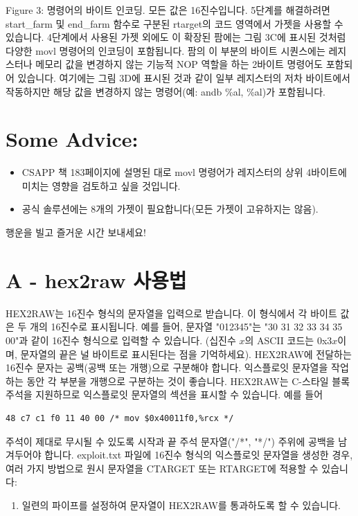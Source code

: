 \documentclass[10pt]{article}
\begin{document}
Figure 3: 명령어의 바이트 인코딩. 모든 값은 16진수입니다. 
\noindent
5단계를 해결하려면 start\_farm 및 end\_farm 함수로 구분된 rtarget의 코드 영역에서 가젯을 사용할 수 있습니다. 4단계에서 사용된 가젯 외에도 이 확장된 팜에는 그림 3C에 표시된 것처럼 다양한 movl 명령어의 인코딩이 포함됩니다. 팜의 이 부분의 바이트 시퀀스에는 레지스터나 메모리 값을 변경하지 않는 기능적 NOP 역할을 하는 2바이트 명령어도 포함되어 있습니다. 여기에는 그림 3D에 표시된 것과 같이 일부 레지스터의 저차 바이트에서 작동하지만 해당 값을 변경하지 않는 명령어(예: andb \%al, \%al)가 포함됩니다.

\section*{Some Advice:}
\begin{itemize}
  \item CSAPP 책 183페이지에 설명된 대로 movl 명령어가 레지스터의 상위 4바이트에 미치는 영향을 검토하고 싶을 것입니다.
  \item 공식 솔루션에는 8개의 가젯이 필요합니다(모든 가젯이 고유하지는 않음).
\end{itemize}
\noindent
행운을 빌고 즐거운 시간 보내세요!

\section*{A - hex2raw 사용법}
HEX2RAW는 16진수 형식의 문자열을 입력으로 받습니다. 이 형식에서 각 바이트 값은 두 개의 16진수로 표시됩니다. 예를 들어, 문자열 "012345"는 "30 31 32 33 34 35 00"과 같이 16진수 형식으로 입력할 수 있습니다. (십진수 $x$의 ASCII 코드는 0x3$x$이며, 문자열의 끝은 널 바이트로 표시된다는 점을 기억하세요).
\noindent
HEX2RAW에 전달하는 16진수 문자는 공백(공백 또는 개행)으로 구분해야 합니다. 익스플로잇 문자열을 작업하는 동안 각 부분을 개행으로 구분하는 것이 좋습니다. HEX2RAW는 C-스타일 블록 주석을 지원하므로 익스플로잇 문자열의 섹션을 표시할 수 있습니다. 예를 들어

\begin{verbatim}
48 c7 c1 f0 11 40 00 /* mov $0x40011f0,%rcx */
\end{verbatim}
\noindent
주석이 제대로 무시될 수 있도록 시작과 끝 주석 문자열("/*", "*/") 주위에 공백을 남겨두어야 합니다.
\noindent
exploit.txt 파일에 16진수 형식의 익스플로잇 문자열을 생성한 경우, 여러 가지 방법으로 원시 문자열을 CTARGET 또는 RTARGET에 적용할 수 있습니다:

\begin{enumerate}
  \item 일련의 파이프를 설정하여 문자열이 HEX2RAW를 통과하도록 할 수 있습니다.
\end{enumerate}
\end{document}
